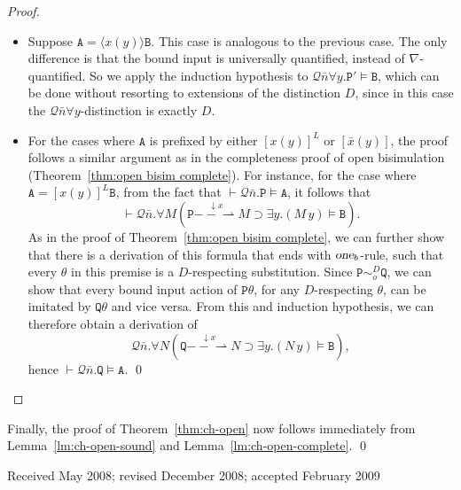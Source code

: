 \documentclass{acmtrans2m}
\def\Qscr{{\mathcal Q}}
\def\Api{{\mathtt A}}
\def\Bpi{{\mathtt B}}
\def\Ppi{{\mathtt P}}
\def\Qpi{{\mathtt Q}}
\newcommand{\inact}{\mathop{\downarrow}}
\newcommand{\oimp}{\supset}
\newcommand{\onep }[3]{#1\stackrel{#2}{-\!\!-\!\!\!\rightharpoonup} #3}
\begin{document}
\begin{proof}
\begin{itemize}
\item Suppose $\Api = \langle x(y) \rangle \Bpi.$ This case is analogous to the previous case. The only
difference is that the bound input is universally quantified, instead of $\nabla$-quantified.
So we apply the induction hypothesis to $\Qscr \bar n \forall y. \Ppi' \models \Bpi$, which can be done
without resorting to extensions of the distinction $D$, since in this case the $\Qscr \bar n \forall y$-distinction
is exactly $D.$

\item For the cases where $\Api$ is prefixed by either $[x(y)]^L$ or $[\bar x(y)]$, the proof follows
a similar argument as in the completeness proof of open bisimulation (Theorem~\ref{thm:open bisim complete}).
For instance, for the case where $\Api = [x(y)]^L \Bpi$, from the fact that 
$\vdash \Qscr \bar n. \Ppi \models \Api$, it follows that 
$$
\vdash \Qscr \bar n. \forall M(\onep{\Ppi}{\inact x}{M} \oimp \exists y. (M\,y) \models \Bpi).
$$
As in the proof of Theorem~\ref{thm:open bisim complete}, we can further show that there is 
a derivation of this formula that ends with $\hbox{\sl one}_b$-rule, such that every $\theta$ in this
premise is a $D$-respecting substitution. 
Since $\Ppi \sim_o^D \Qpi$, we can show that every bound input 
action of $\Ppi\theta$, for any $D$-respecting $\theta$, can be imitated by $\Qpi\theta$ and vice versa. 
From this and induction hypothesis, we can therefore obtain a derivation of 
$$
\Qscr \bar n. \forall N(\onep{\Qpi}{\inact x}{N} \oimp \exists y. (N\,y) \models \Bpi),
$$
hence $\vdash \Qscr \bar n. \Qpi \models \Api.$  \qed
\end{itemize}
\end{proof}

Finally, the proof of Theorem~\ref{thm:ch-open} now follows 
immediately from Lemma~\ref{lm:ch-open-sound} and
Lemma~\ref{lm:ch-open-complete}. 
\qed 



 \begin{received}
 Received May 2008;
 revised December 2008;
 accepted February 2009
 \end{received}

 
\end{document}
